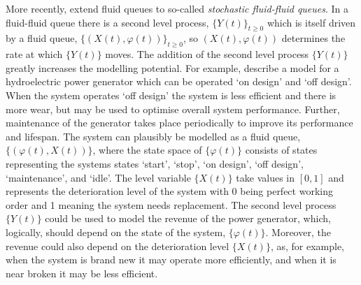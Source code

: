 More recently, \cite{bo2014} extend fluid queues to so-called \emph{stochastic fluid-fluid queues}. In a fluid-fluid queue there is a second level process, \(\{Y(t)\}_{t\geq0}\) which is itself driven by a fluid queue, \(\{(X(t),\varphi(t))\}_{t\geq0}\), so \((X(t),\varphi(t))\) determines the rate at which \(\{Y(t)\}\) moves. The addition of the second level process \(\{Y(t)\}\) greatly increases the modelling potential. For example, \cite{hydro,bo2014} describe a model for a hydroelectric power generator which can be operated `on design' and `off design'. When the system operates `off design' the system is less efficient and there is more wear, but may be used to optimise overall system performance. Further, maintenance of the generator takes place periodically to improve its performance and lifespan. The system can plausibly be modelled as a fluid queue, \(\{(\varphi(t),X(t))\}\), where the state space of \(\{\varphi(t)\}\) consists of states representing the systems states `start', `stop', `on design', `off design', `maintenance', and `idle'. The level variable \(\{X(t)\}\) take values in \([0,1]\) and represents the deterioration level of the system with 0 being perfect working order and 1 meaning the system needs replacement. The second level process \(\{Y(t)\}\) could be used to model the revenue of the power generator, which, logically, should depend on the state of the system, \(\{\varphi(t)\}\). Moreover, the revenue could also depend on the deterioration level \(\{X(t)\}\), as, for example, when the system is brand new it may operate more efficiently, and when it is near broken it may be less efficient. 

